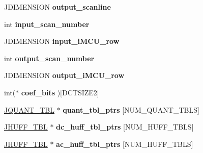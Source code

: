 \begin{DoxyCompactItemize}
J\+D\+I\+M\+E\+N\+S\+I\+ON {\bfseries output\+\_\+scanline}
\item 
\mbox{\label{structjpeg__decompress__struct_a43a1013bf1f6c45afb959f48fd40c66f}} 
int {\bfseries input\+\_\+scan\+\_\+number}
\item 
\mbox{\label{structjpeg__decompress__struct_a6c9d014952341bcfc521ad5b7bce500f}} 
J\+D\+I\+M\+E\+N\+S\+I\+ON {\bfseries input\+\_\+i\+M\+C\+U\+\_\+row}
\item 
\mbox{\label{structjpeg__decompress__struct_abd7d01c79e679a8c8203bc494bc43fb4}} 
int {\bfseries output\+\_\+scan\+\_\+number}
\item 
\mbox{\label{structjpeg__decompress__struct_a8bc74336c804741b32fea874f8410c88}} 
J\+D\+I\+M\+E\+N\+S\+I\+ON {\bfseries output\+\_\+i\+M\+C\+U\+\_\+row}
\item 
\mbox{\label{structjpeg__decompress__struct_adc316824de596d6bd7a178ff44547ccd}} 
int($\ast$ {\bfseries coef\+\_\+bits} )\mbox{[}D\+C\+T\+S\+I\+Z\+E2\mbox{]}
\item 
\mbox{\label{structjpeg__decompress__struct_acadfce86bbd2928bd54197fa81579feb}} 
\hyperlink{structJQUANT__TBL}{J\+Q\+U\+A\+N\+T\+\_\+\+T\+BL} $\ast$ {\bfseries quant\+\_\+tbl\+\_\+ptrs} \mbox{[}N\+U\+M\+\_\+\+Q\+U\+A\+N\+T\+\_\+\+T\+B\+LS\mbox{]}
\item 
\mbox{\label{structjpeg__decompress__struct_a8d4cd26e16fe92bfcfa380b8ba9d0af2}} 
\hyperlink{structJHUFF__TBL}{J\+H\+U\+F\+F\+\_\+\+T\+BL} $\ast$ {\bfseries dc\+\_\+huff\+\_\+tbl\+\_\+ptrs} \mbox{[}N\+U\+M\+\_\+\+H\+U\+F\+F\+\_\+\+T\+B\+LS\mbox{]}
\item 
\mbox{\label{structjpeg__decompress__struct_a25f7b5f953896fbdf03e0502c786776f}} 
\hyperlink{structJHUFF__TBL}{J\+H\+U\+F\+F\+\_\+\+T\+BL} $\ast$ {\bfseries ac\+\_\+huff\+\_\+tbl\+\_\+ptrs} \mbox{[}N\+U\+M\+\_\+\+H\+U\+F\+F\+\_\+\+T\+B\+LS\mbox{]}
\item 
\mbox{\label{structjpeg__decompress__struct_ad55d8fc56faa42d05d1a80ad84ce3e9c}} 

\end{DoxyCompactItemize}
